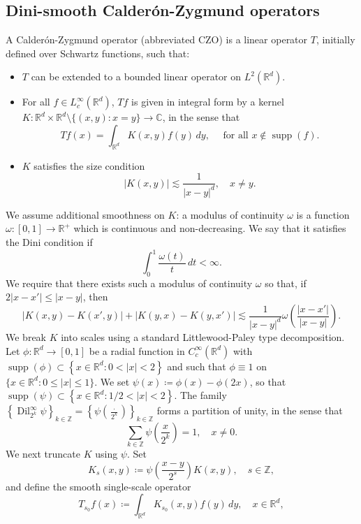 \documentclass[12pt]{amsart}
\newcommand{\R}{\mathbb{R}}
\newcommand{\Z}{\mathbb{Z}}
\newcommand{\supp}[1]{\operatorname{supp}\left(#1\right) }
\theoremstyle{plain}
\theoremstyle{definition} %
\numberwithin{equation}{section}
\begin{document}
\subsection{Dini-smooth Calder\'on-Zygmund operators} A Calder\'on-Zygmund operator  (abbreviated CZO) is a linear operator $T$, initially defined over Schwartz functions, such that:
    \begin{itemize}
        \item $T$ can be extended to a bounded linear operator on $L^2(\mathbb{R}^d)$.
        \item For all $f\in L^\infty_c(\R^d)$, $Tf$ is given in integral form by a kernel $K\colon \mathbb{R}^d\times \mathbb{R}^d\setminus\{(x,y): x=y\}\to \mathbb{C}$, in the sense that
        \[
        Tf(x)
        = \int_{\mathbb{R}^d}K(x,y)f(y)\, dy, \quad \text{ for all } x\not\in \operatorname{supp}(f).
        \]
        \item $K$ satisfies the size condition
        $$
        |K(x,y)| \lesssim \frac{1}{|x-y|^d}, \quad x\neq y.
        $$
    \end{itemize}
We assume additional smoothness on $K$: a modulus of continuity $\omega$ is a function $\omega\colon [0,1]\to \mathbb{R}^{+}$ which is continuous and non-decreasing. We say that it satisfies the Dini condition if 
$$
\int_{0}^{1}\frac{\omega(t)}{t}\, dt<\infty.
$$
We require that there exists such a modulus of continuity $\omega$ so that, if $2|x-x'|\leq |x-y|$, then
\[
|K(x,y)-K(x',y)|+|K(y,x)-K(y,x')|\lesssim \frac{1}{|x-y|^d}\omega\left(\frac{|x-x'|}{|x-y|}\right).
\]
We break $K$ into scales using a standard Littlewood-Paley type decomposition. Let $\phi\colon \R^d\to[0,1]$ be a radial function in $C_c^{\infty}(\R^d)$ with $\supp{\phi}\subset \left\{x\in \mathbb{R}^d: 0<|x|<2\right\}$ and such that $\phi\equiv 1$ on $\{x \in \mathbb{R}^d: 0 \leq|x| \leq 1\}$. We set $\psi(x)\coloneqq \phi(x)-\phi(2 x)$, so that $\supp{\psi}\subset \left\{x\in \mathbb{R}^d: 1/2<|x|<2\right\}$. The family $\left\{\operatorname{Dil}_{2^k}^{\infty} \psi\right\}_{k \in \mathbb{Z}}=\left\{\psi\left(\frac{\cdot}{2^k}\right)\right\}_{k \in \mathbb{Z}}$ forms a partition of unity, in the sense that
\begin{equation*}
\sum_{k \in \mathbb{Z}} \psi\left(\frac{x}{2^k}\right)=1, \quad x \neq 0 . 
\end{equation*}
We next truncate $K$ using $\psi$. Set
$$
K_s(x,y) \coloneqq \psi\left(\frac{x-y}{2^s}\right)K(x,y), \quad s\in \Z,
$$
and define the smooth single-scale operator
$$
T_{s_0}f(x) \coloneqq \int_{\R^d}K_{s_0}(x,y)f(y)\, dy,\quad x\in\R^d,   
$$
\end{document}
